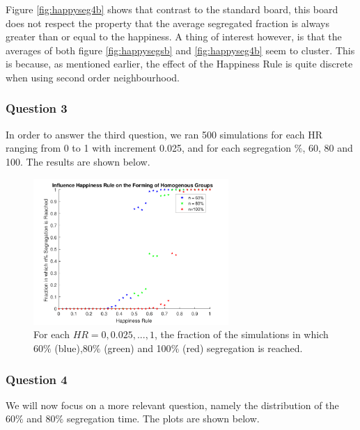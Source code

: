 Figure \ref{fig:happyseg4b} shows that contrast to the standard board, this board does not respect the property that the average segregated fraction is always greater than or equal to the happiness. 
A thing of interest however, is that the averages of both figure \ref{fig:happysegsb} and \ref{fig:happyseg4b} seem to cluster. 
This is because, as mentioned earlier, the effect of the Happiness Rule is quite discrete when using second order neighbourhood.

\subsubsection{Question 3}
In order to answer the third question, we ran 500 simulations for each HR ranging from 0 to 1 with increment 0.025, and for each segregation $\%$, 60, 80 and 100. 
The results are shown below.
\begin{figure}[H]
    \centering
    \includegraphics[width=280px]{happy_segr_60_80_100.pdf}
    \caption{For each $HR = 0,0.025,...,1$, the fraction of the simulations in which 60$\%$ (blue),80$\%$ (green) and 100$\%$ (red) segregation is reached.}
    \label{fig:happyseg4c}
\end{figure}

\subsubsection{Question 4}
We will now focus on a more relevant question, namely the distribution of the $60\%$ and $80\%$ segregation time. 
The plots are shown below.




